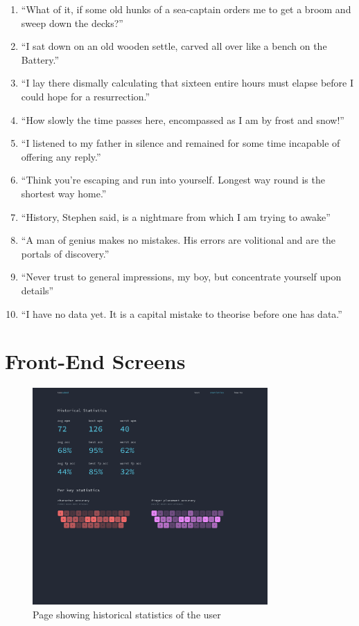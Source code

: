 \documentclass{report}
\begin{document}
\begin{enumerate}
	\item ``What of it, if some old hunks of a sea-captain orders me to get a broom and sweep down the decks?'' \parencite{moby-dick}
	\item ``I sat down on an old wooden settle, carved all over like a bench on the Battery.'' \parencite{moby-dick}
	\item ``I lay there dismally calculating that sixteen entire hours must elapse before I could hope for a resurrection.'' \parencite{moby-dick}
	\item ``How slowly the time passes here, encompassed as I am by frost and snow!'' \parencite{frankenstein}
	\item ``I listened to my father in silence and remained for some time incapable of offering any reply.'' \parencite{frankenstein}
	\item ``Think you’re escaping and run into yourself. Longest way round is the shortest way home.'' \parencite{ulysses}
	\item ``History, Stephen said, is a nightmare from which I am trying to awake'' \parencite{ulysses}
	\item ``A man of genius makes no mistakes. His errors are volitional and are the portals of discovery.'' \parencite{ulysses}
	\item ``Never trust to general impressions, my boy, but concentrate yourself upon details'' \parencite{sherlock}
	\item ``I have no data yet. It is a capital mistake to theorise before one has data.'' \parencite{sherlock}
\end{enumerate}

\chapter{Front-End Screens}
\begin{figure}[H]
	\centering
	\includegraphics[width=0.8\textwidth]{frontend-statistics.png}
	\caption{Page showing historical statistics of the user}
	\centering
\end{figure}
\end{document}
